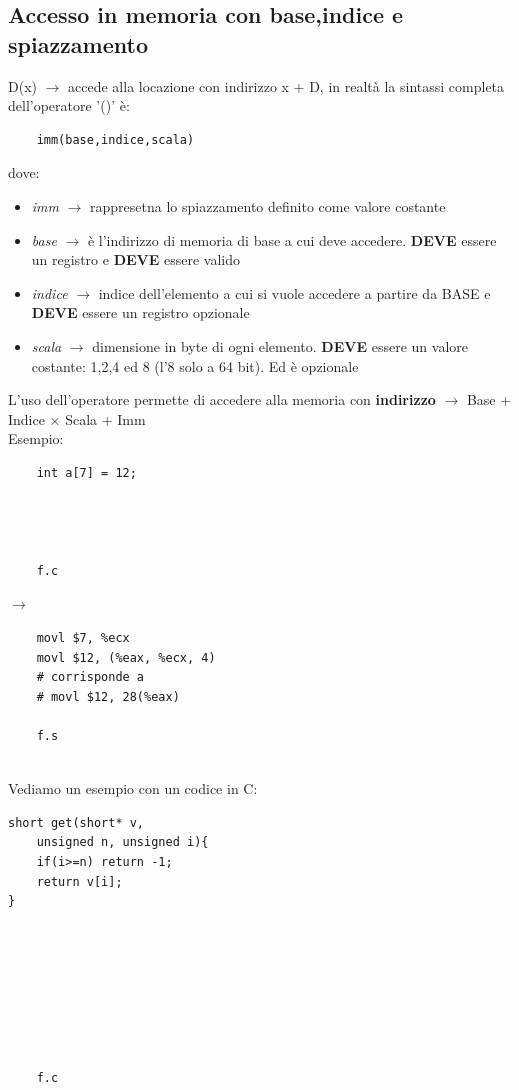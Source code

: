 \subsection{Accesso in memoria con base,indice e spiazzamento}
D(x) $\rightarrow$ accede alla locazione con indirizzo x + D, in realtà la sintassi completa dell'operatore '()' è: 
\begin{verbatim}
    imm(base,indice,scala)
\end{verbatim}
\noindent dove:
\begin{itemize}
    \item \textit{imm} $\rightarrow$ rappresetna lo spiazzamento definito come valore costante
    \item \textit{base} $\rightarrow$ è l'indirizzo di memoria di base a cui deve accedere. \textbf{DEVE} essere un registro e \textbf{DEVE} essere valido
    \item \textit{indice} $\rightarrow$ indice dell'elemento a cui si vuole accedere a partire da BASE e \textbf{DEVE} essere un registro opzionale
    \item \textit{scala} $\rightarrow$ dimensione in byte di ogni elemento. \textbf{DEVE} essere un valore costante: 1,2,4 ed 8 (l'8 solo a 64 bit). Ed è opzionale
\end{itemize}
\noindent L'uso dell'operatore permette di accedere alla memoria con \textbf{indirizzo} $\rightarrow$ Base + Indice $\times$ Scala + Imm\\
Esempio: \medskip \\ 
\begin{minipage}{0.4\textwidth}
    \begin{verbatim}
    int a[7] = 12;




    f.c
    \end{verbatim}
\end{minipage}
\hfill
$\longrightarrow$
\hfill
\begin{minipage}{0.4\textwidth}
    \begin{verbatim}
    movl $7, %ecx
    movl $12, (%eax, %ecx, 4)
    # corrisponde a 
    # movl $12, 28(%eax)
    
    f.s
    \end{verbatim}
\end{minipage} \medskip \\
\noindent Vediamo un esempio con un codice in C: \medskip\\
\begin{minipage}{0.2\textwidth}
    \begin{verbatim}
short get(short* v, 
    unsigned n, unsigned i){
    if(i>=n) return -1;
    return v[i];
}








    f.c
    \end{verbatim}
\end{minipage}

